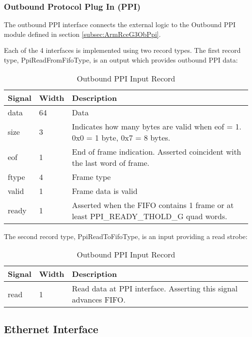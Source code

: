\documentclass[11pt]{article}
\begin{document}
\subsubsection{Outbound Protocol Plug In (PPI)}
\label{subsubsec:external_ob_ppi}

The outbound PPI interface connects the external logic to the Outbound PPI module defined in section \ref{subsec:ArmRceG3ObPpi}.

Each of the 4 interfaces is implemented using two record types. The first record type, PpiReadFromFifoType, is an output which provides outbound PPI data:

\begin{table}[H]
\small
\centering
   \begin{tabular}{| l | l | l | }
      \hline \textbf{Signal} & \textbf{Width}  & \textbf{Description} \\
      \hline data    & 64    & Data       \\
      \hline size    & 3     & Indicates how many bytes are valid when eof = 1. 0x0 = 1 byte, 0x7 = 8 bytes.       \\
      \hline eof     & 1     & End of frame indication. Asserted coincident with the last word of frame.       \\
      \hline ftype   & 4     & Frame type       \\
      \hline valid   & 1     & Frame data is valid       \\
      \hline ready   & 1     & Asserted when the FIFO contains 1 frame or at least PPI\_READY\_THOLD\_G quad words. \\
      \hline
   \end{tabular}
   \caption{Outbound PPI Input Record}
\end{table}

The second record type, PpiReadToFifoType, is an input providing a read strobe:

\begin{table}[H]
\small
\centering
   \begin{tabular}{| l | l | l | }
      \hline \textbf{Signal} & \textbf{Width}  & \textbf{Description} \\
      \hline read    & 1     & Read data at PPI interface. Asserting this signal advances FIFO. \\
      \hline
   \end{tabular}
   \caption{Outbound PPI Input Record}
\end{table}

\subsection{Ethernet Interface}
\label{subsec:external_ethernet}
\end{document}
